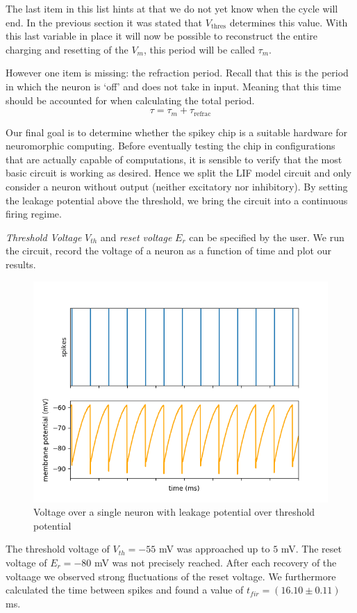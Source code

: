 \documentclass[a4paper,twocolumn]{article}
\begin{document}
The last item in this list hints at that we do not yet know when the cycle will
end. In the previous section it was stated that $V_\text{thres}$ determines
this value. With this last variable in place it will now be possible to
reconstruct the entire charging and resetting of the $V_m$, this period will be
called $\tau_m$.

However one item is missing: the refraction period. Recall that this is the
period in which the neuron is `off' and does not take in input. Meaning that
this time should be accounted for when calculating the total period.
\begin{equation}
    \tau = \tau_m + \tau_\text{refrac}
    \label{eq:tau}
\end{equation}

Our final goal is to determine whether the spikey chip is a suitable hardware for
neuromorphic computing.  Before eventually testing the chip in configurations
that are actually capable of computations,  it is sensible to verify that the
most basic circuit is working as desired.  Hence we split the LIF model circuit
and only consider a neuron without output (neither excitatory nor inhibitory).
By setting the leakage potential above the threshold, we bring the circuit into
a continuous firing regime. \par
\textit{Threshold Voltage} $V_{th}$ and \textit{reset voltage} $E_r$ can be
specified by the user.  We run the circuit,  record the voltage of a neuron as
a function of time and plot our results.

\begin{figure}[ht]
    \centering
    \includegraphics[width=.5\textwidth]{figures/fp_task1_1membrane.png}
    \caption{Voltage over a single neuron with leakage potential over threshold potential}
    \label{fig:membranes_ex1}
\end{figure}

The threshold voltage of $V_{th} = -55$ mV was approached up to $5$ mV.  The reset voltage of $E_r = -80$ mV was not precisely reached.  After each recovery of the voltaage we observed strong fluctuations of the reset voltage.  We furthermore calculated the time between spikes and found a value of $t_{fir} = (16.10\pm 0.11)$ ms.
\end{document}
